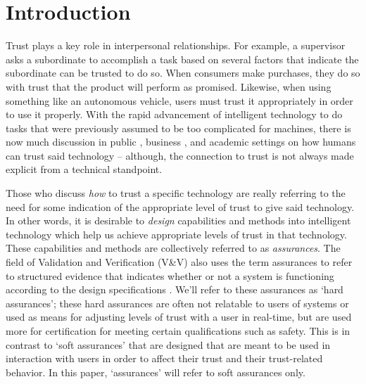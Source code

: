 \section{Introduction}
    Trust plays a key role in interpersonal relationships. 
    For example, a supervisor asks a subordinate to accomplish a task based on several factors that indicate the subordinate can be trusted to do so. When consumers make purchases, they do so with trust that the product will perform as promised. Likewise, when using something like an autonomous vehicle, users must trust it appropriately in order to use it properly. 
With the rapid advancement of intelligent technology to do tasks that were previously assumed to be too complicated for machines, there is now much discussion in public \cite{Spectrum2016-jv,DeSteno2014-cq,Cranz2017-yh,Cassel2017-tn,Danks2017-sb,Wagner2016-ck}, business \cite{Banavar2016-nm, Khosravi2016-ke,Moody2017-vd,Rudnitsky2017-in,Benioff2016-tc,Tankard2016-rk}, and academic settings \cite{Groom2007-bz,Lloyd2014-bb,Goodrum_2016-fm,Foley2017-qj,Ghahramani2015-yq,Castelvecchi2016-mr} on how humans can trust said technology -- although, the connection to trust is not always made explicit from a technical standpoint. 

    Those who discuss \emph{how} to trust a specific technology are really referring to the need for some indication of the appropriate level of trust to give said technology. In other words, it is desirable to \emph{design} capabilities and methods into intelligent technology which help us achieve appropriate levels of trust in that technology. These capabilities and methods are collectively referred to as \textit{assurances}. The field of Validation and Verification (V\&V) also uses the term assurances to refer to structured evidence that indicates whether or not a system is functioning according to the design specifications \cite{Calinescu2017-fh}. We'll refer to these assurances as `hard assurances'; these hard assurances are often not relatable to users of systems or used as means for adjusting levels of trust with a user in real-time, but are used more for certification for meeting certain qualifications such as safety. This is in contrast to `soft assurances' that are designed that are meant to be used in interaction with users in order to affect their trust and their trust-related behavior. In this paper, `assurances' will refer to soft assurances only.
    
